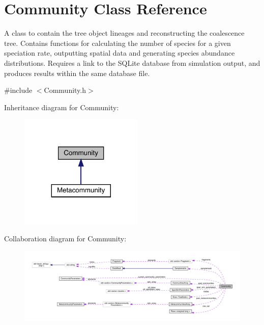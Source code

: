 \hypertarget{class_community}{}\section{Community Class Reference}
\label{class_community}


A class to contain the tree object lineages and reconstructing the coalescence tree. Contains functions for calculating the number of species for a given speciation rate, outputting spatial data and generating species abundance distributions. Requires a link to the S\+Q\+Lite database from simulation output, and produces results within the same database file.  




{\ttfamily \#include $<$Community.\+h$>$}



Inheritance diagram for Community\+:\nopagebreak
\begin{figure}[H]
\begin{center}
\leavevmode
\includegraphics[width=167pt]{class_community__inherit__graph}
\end{center}
\end{figure}


Collaboration diagram for Community\+:\nopagebreak
\begin{figure}[H]
\begin{center}
\leavevmode
\includegraphics[width=350pt]{class_community__coll__graph}
\end{center}
\end{figure}
